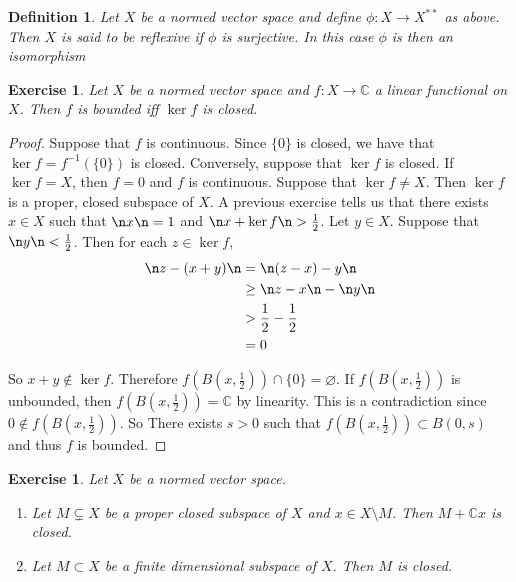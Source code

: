 \documentclass[12pt]{amsart}
\newtheorem{defn}[thm]{Definition}
\newtheorem{ex}[thm]{Exercise}
\newcommand{\C}{\mathbb{C}}
\begin{document}
\begin{defn}
	Let $X$ be a normed vector space and define $\phi:X \rightarrow X^{**}$ as above. Then $X$ is said to be reflexive if $\phi$ is surjective. In this case $\phi$ is then an isomorphism
\end{defn}

\begin{ex}
	Let $X$ be a normed vector space and $f:X \rightarrow \C$ a linear functional on $X$. Then $f$ is bounded iff $\ker f$ is closed. 
\end{ex}

\begin{proof}
	Suppose that $f$ is continuous. Since $\{0\}$ is closed, we have that $\ker f = f^{-1}(\{0\})$ is closed. Conversely, suppose that $\ker f$ is closed. If $\ker f = X$, then $f =0$ and $f$ is continuous. Suppose that $\ker f \neq X$. Then $\ker f$ is a proper, closed subspace of $X$. A previous exercise tells us that there exists $x \in X$ such that $\n x \n = 1$ and $\n x + \ker f \n > \frac{1}{2}$. Let $y \in X$. Suppose that $\n y \n < \frac{1}{2}$. Then for each $z \in \ker f$, 
	\begin{align*}
		\n z -  (x+y)\n 
		& = \n (z-x) -y \n \\
		& \geq \n z-x \n - \n y \n \\
		& > \frac{1}{2} - \frac{1}{2} \\
		&=0
	\end{align*}
	
	So $x+y \not \in \ker f$. Therefore $f(B(x,\frac{1}{2})) \cap \{0\} = \varnothing$. If $f(B(x,\frac{1}{2})) $ is unbounded, then $f(B(x,\frac{1}{2})) = \C$ by linearity. This is a contradiction since $0 \not \in f(B(x,\frac{1}{2}))$. So There exists $s > 0$ such that $f(B(x,\frac{1}{2})) \subset B(0,s)$ and thus $f$ is bounded. 
\end{proof}

\begin{ex}
	Let $X$ be a normed vector space. 
	\begin{enumerate}
		\item Let $M \subsetneq X$ be a proper closed subspace of $X$ and $x \in X \setminus M$. Then $M + \C x$ is closed.
		\item Let $M \subset X$ be a finite dimensional subspace of $X$. Then $M$ is closed.
	\end{enumerate}
\end{ex}
\end{document}
